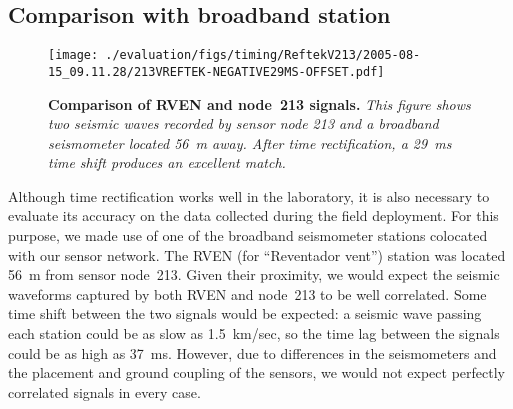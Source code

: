 

\subsection{Comparison with broadband station}
\label{sec-datagroundtruthing}

\begin{figure}[t]
\begin{center}
\texttt{[image: ./evaluation/figs/timing/ReftekV213/2005-08-15\_09.11.28/213VREFTEK-NEGATIVE29MS-OFFSET.pdf]}
\end{center}
\caption{\small {\bf Comparison of RVEN and node~213 signals.} 
{\em This figure shows two seismic waves recorded by sensor node 213 and a
broadband seismometer located 56~m away. After time rectification, a 29~ms
time shift produces an excellent match.}}
\label{fig-rvenv213}
\end{figure}

Although time rectification works well in the laboratory, it is also
necessary to evaluate its accuracy on the data collected during the field
deployment. For this purpose, we made use of one of the broadband seismometer
stations colocated with our sensor network. The RVEN (for ``Reventador
vent'') station was located 56~m from sensor node~213.  
Given their proximity, we would expect
the seismic waveforms captured by both RVEN and node~213 to be
well correlated.  Some time shift between the two signals would be expected:
a seismic wave passing each station could be as slow as 1.5~km/sec, so
the time lag between the signals could be as high as 37~ms.  However, due to
differences in the seismometers and the placement and ground coupling of the
sensors, we would not expect perfectly correlated signals in every
case.



